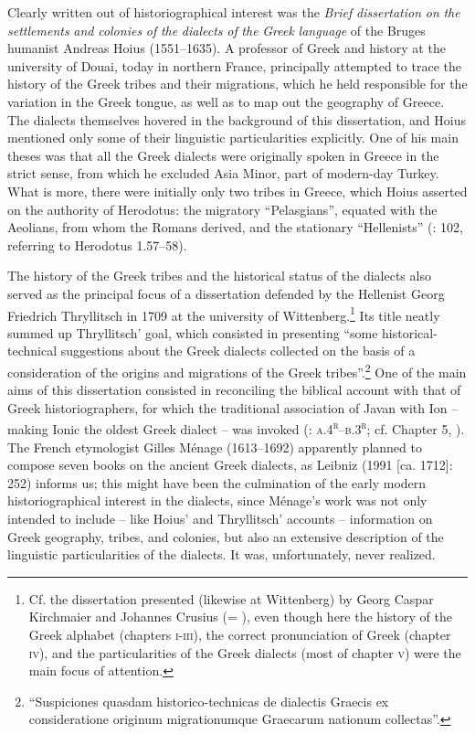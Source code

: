Clearly written out of historiographical interest was the \textit{Brief} \textit{dissertation} \textit{on} \textit{the} \textit{settlements} \textit{and} \textit{colonies} \textit{of} \textit{the} \textit{dialects} \textit{of} \textit{the} \textit{Greek} \textit{language}  of the Bruges humanist Andreas Hoius (1551–1635). A professor of Greek and history at the university of Douai, today in northern France, \citet[95]{Hoius1620} principally attempted to trace the history of the Greek tribes and their migrations, which he held responsible for the variation in the Greek tongue, as well as to map out the geography of Greece. The dialects themselves hovered in the background of this dissertation, and Hoius mentioned only some of their linguistic particularities explicitly. One of his main theses was that all the Greek dialects were originally spoken in Greece in the strict sense, from which he excluded Asia Minor, part of modern-day Turkey.\textsuperscript{} What is more, there were initially only two tribes in Greece, which Hoius asserted on the authority of Herodotus: the migratory “Pelasgians”, equated with the Aeolians, from whom the Romans derived, and the stationary “Hellenists” (\citealt{Hoius1620}: 102, referring to Herodotus 1.57–58).

The history of the Greek tribes and the historical status of the dialects also served as the principal focus of a dissertation defended by the Hellenist Georg Friedrich Thryllitsch in 1709 at the university of Wittenberg.\footnote{Cf. the dissertation presented (likewise at Wittenberg) by Georg Caspar Kirchmaier and Johannes Crusius (= \citealt{KirchmaierCrusius1684}), even though here the history of the Greek alphabet (chapters \textsc{i}{}-\textsc{iii}), the correct pronunciation of Greek (chapter \textsc{iv}), and the particularities of the Greek dialects (most of chapter \textsc{v}) were the main focus of attention.} Its title neatly summed up Thryllitsch’ goal, which consisted in presenting “some historical-technical suggestions about the Greek dialects collected on the basis of a consideration of the origins and migrations of the Greek tribes”.\footnote{“Suspiciones quasdam historico-technicas de dialectis Graecis ex consideratione originum migrationumque Graecarum nationum collectas”.} One of the main aims of this dissertation consisted in reconciling the biblical account with that of Greek historiographers, for which the traditional association of Javan with Ion – making Ionic the oldest Greek dialect – was invoked (\citealt{Thryllitsch1709}: \textsc{a.4}\textsc{\textsuperscript{r}}\textsc{–b.3}\textsc{\textsuperscript{r}}; cf. Chapter 5, ). The French etymologist Gilles Ménage (1613–1692) apparently planned to compose seven books on the ancient Greek dialects, as Leibniz (1991 [ca. 1712]: 252) informs us; this might have been the culmination of the early modern historiographical interest in the dialects, since Ménage’s work was not only intended to include – like Hoius’ and Thryllitsch’ accounts – information on Greek geography, tribes, and colonies, but also an extensive description of the linguistic particularities of the dialects. It was, unfortunately, never realized.

